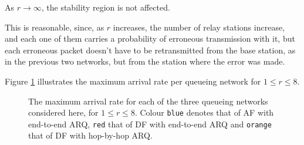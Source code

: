 As $r \to \infty$, the stability region is not affected.

This is reasonable, since, as $r$ increases, the number of relay stations
increase, and each one of them carries a probability of erroneous transmission
with it, but each erroneous packet doesn't have to be retransmitted from the
base station, as in the previous two networks, but from the station where the
error was made.

Figure \ref{fig:04_stability_regions} illustrates the maximum arrival rate
per queueing network for $1 \leq r \leq 8$.

\begin{figure}[H]\centering
  
  \caption{The maximum arrival rate for each of the three queueing networks
    considered here, for $1 \leq r \leq 8$. Colour \texttt{blue} denotes that of
    AF with end-to-end ARQ, \texttt{red} that of DF with end-to-end ARQ and
    \texttt{orange} that of DF with hop-by-hop ARQ.}
  \label{fig:04_stability_regions}
\end{figure}

